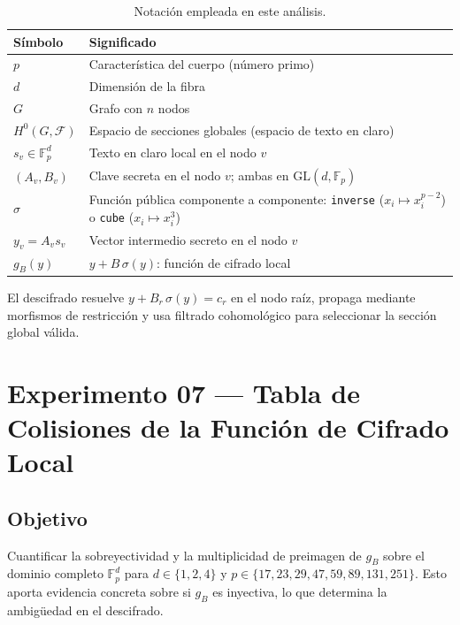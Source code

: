 \documentclass[12pt,a4paper]{article}
\theoremstyle{definition}
\newcommand{\Fp}{\mathbb{F}_p}
\newcommand{\GL}{\mathrm{GL}}
\newcommand{\Hzero}{H^{0}}
\newcommand{\calF}{\mathcal{F}}
\begin{document}
\begin{table}[h]
\centering
\caption{Notación empleada en este análisis.}
\label{tab:notacion}
\begin{tabularx}{\linewidth}{>{\ttfamily}lX}
\toprule
\normalfont Símbolo & Significado \\
\midrule
$p$                & Característica del cuerpo (número primo) \\
$d$                & Dimensión de la fibra \\
$G$                & Grafo con $n$ nodos \\
$\Hzero(G, \calF)$ & Espacio de secciones globales (espacio de texto en claro) \\
$s_v \in \Fp^d$    & Texto en claro local en el nodo $v$ \\
$(A_v, B_v)$       & Clave secreta en el nodo $v$; ambas en $\GL(d,\Fp)$ \\
$\sigma$           & Función pública componente a componente:
                     \texttt{inverse} ($x_i \mapsto x_i^{p-2}$)
                     o \texttt{cube} ($x_i \mapsto x_i^3$) \\
$y_v = A_v s_v$    & Vector intermedio secreto en el nodo $v$ \\
$g_B(y)$           & $y + B\,\sigma(y)$: función de cifrado local \\
\bottomrule
\end{tabularx}
\end{table}

El descifrado resuelve $y + B_r\,\sigma(y) = c_r$ en el nodo raíz,
propaga mediante morfismos de restricción y usa filtrado cohomológico
para seleccionar la sección global válida.

\section{Experimento 07 --- Tabla de Colisiones de la Función de Cifrado Local}

\subsection{Objetivo}

Cuantificar la sobreyectividad y la multiplicidad de preimagen de
$g_B$ sobre el dominio completo $\Fp^d$ para $d \in \{1, 2, 4\}$ y
$p \in \{17, 23, 29, 47, 59, 89, 131, 251\}$.
Esto aporta evidencia concreta sobre si $g_B$ es inyectiva, lo que
determina la ambigüedad en el descifrado.
\end{document}
